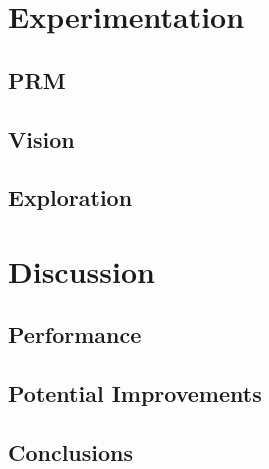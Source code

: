 \documentclass[conference]{IEEEtran}
\begin{document}
\section{Experimentation}
\subsection{PRM}
\subsection{Vision}
\subsection{Exploration}
\section{Discussion}
\subsection{Performance}
\subsection{Potential Improvements}
\subsection{Conclusions}



\end{document}
